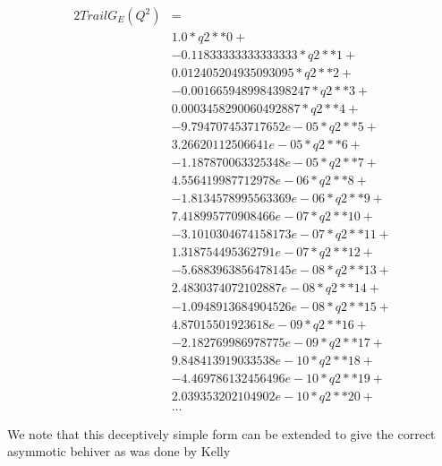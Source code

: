 \documentclass[10pt,aps,prc,twocolumn]{revtex4-1}
\begin{document}
\begin{alignat*}{2}
Trail G_E(Q^2) & =  \\
&1.0*q2**0 + \\
&-0.11833333333333333*q2**1 + \\
&0.012405204935093095*q2**2 + \\
&-0.0016659489984398247*q2**3 + \\
&0.0003458290060492887*q2**4 + \\
&-9.794707453717652e-05*q2**5 + \\
&3.26620112506641e-05*q2**6 + \\
&-1.187870063325348e-05*q2**7 + \\
&4.556419987712978e-06*q2**8 + \\
&-1.8134578995563369e-06*q2**9 + \\
&7.418995770908466e-07*q2**10 + \\
&-3.1010304674158173e-07*q2**11 + \\
&1.318754495362791e-07*q2**12 + \\
&-5.6883963856478145e-08*q2**13 + \\
&2.4830374072102887e-08*q2**14 + \\
&-1.0948913684904526e-08*q2**15 +\\ 
&4.87015501923618e-09*q2**16 + \\
&-2.182769986978775e-09*q2**17 + \\
&9.848413919033538e-10*q2**18 + \\
&-4.469786132456496e-10*q2**19 + \\
&2.039353202104902e-10*q2**20 + \\
&...
\end{alignat*}

We note that this deceptively simple form can be extended to give the correct asymmotic behiver
as was done by Kelly~\cite{}
\end{document}
